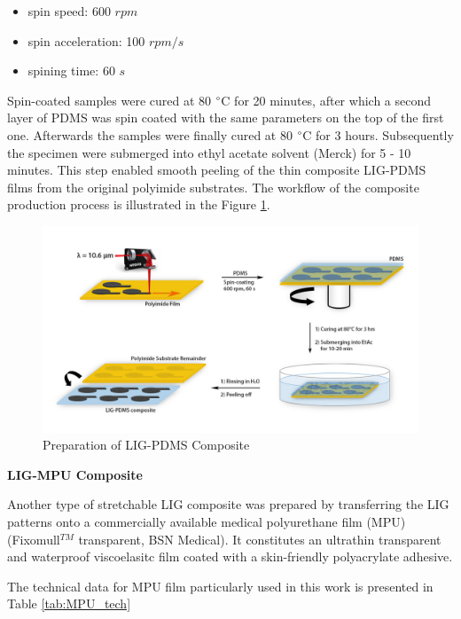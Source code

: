 \begin{itemize}
\item spin speed: 600 $rpm$
\item spin acceleration: 100 $rpm/s$
\item spining time: 60 $s$
\end{itemize}

Spin-coated samples were cured at 80 $\degree$C for 20 minutes, after which a second layer of PDMS was spin coated with the same parameters on the top of the first one. Afterwards the samples were finally cured at  80 $\degree$C for 3 hours. Subsequently the specimen were submerged into ethyl acetate solvent (Merck) for 5 - 10 minutes. This step enabled smooth peeling of the thin composite LIG-PDMS films from the original polyimide substrates. The workflow of the composite production process is illustrated in the Figure \ref{fig:PDMS_LIG_production}.

\begin{figure}[H]
\centering
\includegraphics[width=1\textwidth]{Figures/ExperimentalSetup/LIG_PDMS_Production.jpg}
\medskip
\caption{Preparation of LIG-PDMS Composite}
\label{fig:PDMS_LIG_production}
\end{figure}

\medskip
\textbf{LIG-MPU Composite}

Another type of stretchable LIG composite was prepared by transferring the LIG patterns onto a commercially available medical polyurethane film (MPU) (Fixomull$^{TM}$ transparent, BSN Medical). It constitutes an ultrathin transparent and waterproof viscoelasitc film coated with a skin-friendly polyacrylate adhesive.

The technical data for MPU film particularly used in this work is presented in Table \ref{tab:MPU_tech}

